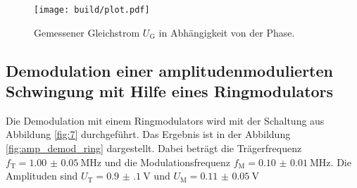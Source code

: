 

\begin{figure}
  \centering
  \texttt{[image: build/plot.pdf]}
  \caption{Gemessener Gleichstrom $U_{\text{G}}$ in Abhängigkeit von der Phase.}
  \label{fig:plot}
\end{figure}


\FloatBarrier
\subsection{Demodulation einer amplitudenmodulierten Schwingung
mit Hilfe eines Ringmodulators}
\label{subsubsec:auswertung_f}
Die Demodulation mit einem Ringmodulators wird mit der Schaltung
aus Abbildung \ref{fig:7} durchgeführt. Das Ergebnis ist
in der Abbildung \ref{fig:amp_demod_ring} dargestellt.
Dabei beträgt die Trägerfrequenz $f_{\text{T}}=\SI{1.00(5)}{\mega\hertz}$
und die Modulationsfrequenz $f_{\text{M}}=\SI{0.10(1)}{\mega\hertz}$.
Die Amplituden sind $U_{\text{T}}=\SI{0.9(1)}{\volt}$ und $U_{\text{M}}=\SI{0.11(5)}{\volt}$

